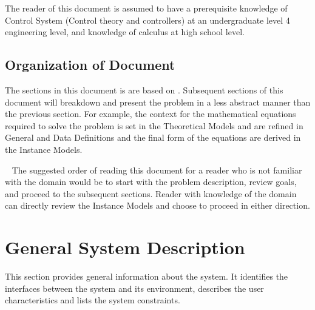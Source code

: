 \documentclass[12pt]{article}
\begin{document}
The reader of this document is assumed to have a prerequisite knowledge of 
Control System (Control theory and controllers) at an undergraduate level 4
engineering level, and knowledge of calculus at high school level. 

\subsection{Organization of Document}


The sections in this document is are based on \citet{SmithAndLai2005, 
SmithEtAl2007}. Subsequent sections of this document will breakdown and present 
the problem in a less abstract manner than the previous section. 
For example, the context for the mathematical equations required to solve the 
problem is set in the Theoretical Models and are refined in General and Data 
Definitions and the final form of the equations are derived in the Instance 
Models. 

~\newline
The suggested order of reading this document for a reader who is not familiar 
with the domain would be to start with the problem description, review goals, 
and proceed to the subsequent sections. Reader with knowledge of the domain 
can directly review the Instance Models and choose to proceed in either direction.

\section{General System Description}

This section provides general information about the system. It identifies the
interfaces between the system and its environment, describes the user
characteristics and lists the system constraints.  

\end{document}
